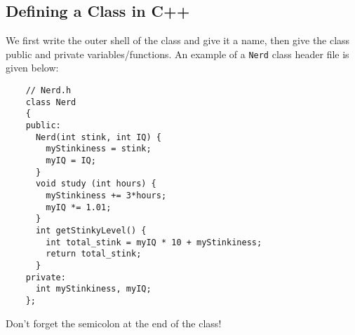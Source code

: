 \documentclass[class=article, crop=false]{standalone}
\begin{document}
  \subsection{Defining a Class in C++}
  We first write the outer shell of the class and give it a name, then give the class public and private variables/functions. An example of a \texttt{Nerd} class header file is given below:
  \begin{lstlisting}
    // Nerd.h
    class Nerd
    {
    public:
      Nerd(int stink, int IQ) {
        myStinkiness = stink;
        myIQ = IQ;
      }
      void study (int hours) {
        myStinkiness += 3*hours;
        myIQ *= 1.01;
      }
      int getStinkyLevel() {
        int total_stink = myIQ * 10 + myStinkiness;
        return total_stink;
      }
    private:
      int myStinkiness, myIQ;
    };
  \end{lstlisting}
  \begin{note}{}
    Don't forget the semicolon at the end of the class!
  \end{note}
\end{document}
